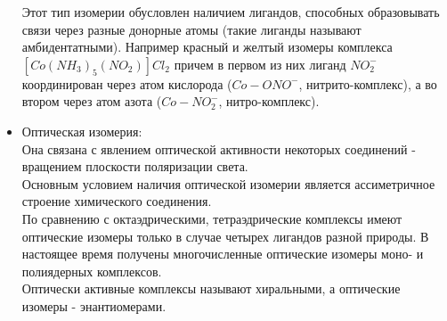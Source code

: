 \begin{itemize}
	Этот тип изомерии обусловлен наличием лигандов, способных образовывать связи через разные донорные атомы (такие лиганды называют амбидентатными). Например красный и желтый изомеры комплекса $ \left[ Co(NH_3)_5(NO_2) \right]Cl_2 $ причем в первом из них лиганд $NO_2^-$ координирован через атом кислорода ($Co-ONO^-$, нитрито-комплекс), а во втором через атом азота ($Co-NO_2^-$, нитро-комплекс).
	\item Оптическая изомерия: \\
	Она связана с явлением оптической активности некоторых соединений - вращением плоскости поляризации света. \\
	Основным условием наличия оптической изомерии является ассиметричное строение химического соединения. \\
	По сравнению с октаэдрическими, тетраэдрические комплексы имеют оптические изомеры только в случае четырех лигандов разной природы. В настоящее время получены многочисленные оптические изомеры моно- и полиядерных комплексов. \\ Оптически активные комплексы называют хиральными, а оптические изомеры - энантиомерами.
	\begin{figure} [H]
		\centering {\texttt{[image: qq6]}}
	\end{figure}
\end{itemize}
